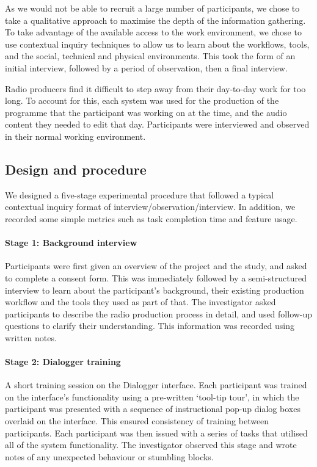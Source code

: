 As we would not be able to recruit a large number of participants, we chose to take a qualitative approach to maximise
the depth of the information gathering. To take advantage of the available access to the work environment, we chose to
use contextual inquiry techniques to allow us to learn about the workflows, tools, and the social, technical and
physical environments. This took the form of an initial interview, followed by a period of observation, then a final
interview.

Radio producers find it difficult to step away from their day-to-day work for too long.  To account for this, each
system was used for the production of the programme that the participant was working on at the time, and the audio
content they needed to edit that day. Participants were interviewed and observed in their normal working environment.

\subsection{Design and procedure}
We designed a five-stage experimental procedure that followed a typical contextual inquiry format of
interview/observation/interview. In addition, we recorded some simple metrics such as task completion time and feature
usage.

\paragraph{Stage 1: Background interview}
    Participants were first given an overview of the project and the study, and asked to complete a consent form. This
    was immediately followed by a semi-structured interview to learn about the participant's background, their existing
    production workflow and the tools they used as part of that. The investigator asked participants to describe the
    radio production process in detail, and used follow-up questions to clarify their understanding. This information
    was recorded using written notes.

\paragraph{Stage 2: Dialogger training}
    A short training session on the Dialogger interface.  Each participant was trained on the interface's
    functionality using a pre-written `tool-tip tour', in which the participant was presented with a sequence of
    instructional pop-up dialog boxes overlaid on the interface.  This ensured consistency of training between
    participants. Each participant was then issued with a series of tasks that utilised all of the system
    functionality. The investigator observed this stage and wrote notes of any unexpected behaviour or stumbling
    blocks.

